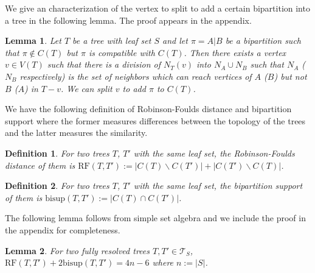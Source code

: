 \documentclass{bmcart}
\newcommand{\bs}{\mathrm{bisup}}
\newcommand{\RF}{\mathrm{RF}}
\newcommand{\bisuptwo}{\textsc{Bisup-Supertree-$2$}\xspace}
\DeclareMathOperator*{\argmax}{argmax}
\newtheorem{lemma}{Lemma}
\newtheorem{definition}{Definition}
\begin{document}
We give an characterization of the vertex to split to add a certain bipartition into a tree in the following lemma. The proof appears in the appendix. 
\begin{lemma} \label{lem:vertex_to_split}
    Let $T$ be a tree with leaf set $S$ and let $\pi = A|B$ be a bipartition such that $\pi \notin C(T)$ but $\pi$ is compatible with $C(T)$. Then there exists a vertex $v \in V(T)$ such that there is a division of $N_T(v)$ into $N_A \cup N_B$ such that $N_A$ ($N_B$ respectively) is the set of neighbors which can reach vertices of $A$ ($B$) but not $B$ ($A$) in $T-v$. We can split $v$ to add $\pi$ to $C(T)$.
\end{lemma}

We have the following definition of Robinson-Foulds distance and bipartition support where the former measures differences between the topology of the trees and the latter measures the similarity.
\begin{definition}
For two trees $T$, $T'$ with the same leaf set, the \textit{Robinson-Foulds distance} of them is $\RF(T, T') := |C(T)\backslash C(T')| + |C(T') \backslash C(T)|$.
\end{definition}

\begin{definition}
For two trees $T$, $T'$ with the same leaf set, the \textit{bipartition support} of them is $\bs(T, T') := |C(T) \cap C(T')|$.
\end{definition}

The following lemma follows from simple set algebra and we include the proof in the appendix for completeness.
\begin{lemma}\label{lem:sum_RF_support}
For two fully resolved trees $T,T' \in \mathcal{T}_S$, $\RF(T,T')+2\bs(T,T') = 4n - 6$ where $n := |S|$.
\end{lemma}

\end{document}
